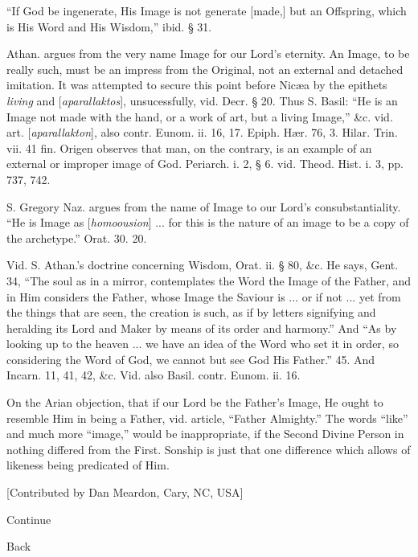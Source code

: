 ``If God be ingenerate, His Image is not
generate [made,] but an Offspring, which is His Word and His
Wisdom,'' ibid. § 31.

Athan. argues from the very name Image for our
Lord's eternity. An Image, to be really such, must be an impress
from the Original, not an external and detached imitation. It was
attempted to secure this point before Nicæa by the epithets \emph{living}
and [\emph{aparallaktos}], unsucessfully, vid. Decr. § 20. Thus S.
Basil: ``He is an Image not made with the hand, or a work of art, but
a living Image,'' \&c. vid. art. [\emph{aparallakton}], also
contr. Eunom. ii. 16, 17. Epiph. Hær. 76, 3. Hilar. Trin. vii. 41
fin. Origen observes that man, on the contrary, is an example of an
external or improper image of God. Periarch. i. 2, § 6. vid. Theod.
Hist. i. 3, pp. 737, 742.

S. Gregory Naz. argues from the name of Image to
our Lord's consubstantiality. ``He is Image as [\emph{homoousion}]
... for this is the nature of an image to be a copy of the
archetype.'' Orat. 30. 20.

Vid. S. Athan.'s doctrine concerning Wisdom,
Orat. ii. § 80, \&c. He says, Gent. 34, ``The soul as in a
mirror, contemplates the Word the Image of the Father, and in Him
considers the Father, whose Image the Saviour is ... or if not ... yet
from the things that are seen, the creation is such, as if by letters
signifying and heralding its Lord and Maker by means of its order and
harmony.'' And ``As by looking up to the heaven ... we have an idea
of the Word who set it in order, so considering the Word of God, we
cannot but see God His Father.'' 45. And Incarn. 11, 41, 42, \&c.
Vid. also Basil. contr. Eunom. ii. 16.

On the Arian objection, that if our Lord be the
Father's Image, He ought to resemble Him in being a Father,
vid. article, ``Father Almighty.'' The words ``like'' and much
more ``image,'' would be inappropriate, if the Second Divine Person
in nothing differed from the First. Sonship is just that one
difference which allows of likeness being predicated of Him.

[Contributed by Dan Meardon, Cary, NC, USA]

Continue

Back


